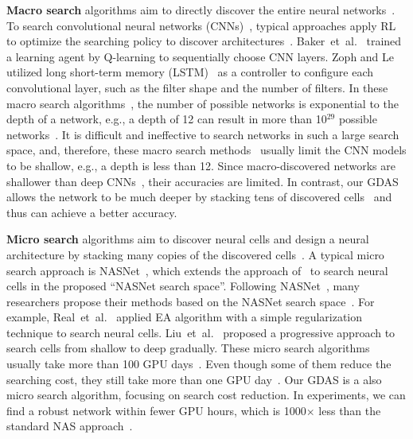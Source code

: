 \documentclass[10pt,twocolumn,letterpaper]{article}
\begin{document}
\textbf{Macro search} algorithms aim to directly discover the entire neural networks~\cite{cai2018efficient,brock2018smash,Véniat_2018_CVPR,zoph2017NAS,li2019partial}.
To search convolutional neural networks (CNNs)~\cite{krizhevsky2012imagenet}, typical approaches apply RL to optimize the searching policy to discover architectures~\cite{baker2017designing,cai2018efficient,zoph2017NAS,pmlr-v80-pham18a}.
Baker~et~al.~\cite{baker2017designing} trained a learning agent by Q-learning to sequentially choose CNN layers.
Zoph and Le~\cite{zoph2017NAS} utilized long short-term memory (LSTM)~\cite{hochreiter1997long} as a controller to configure each convolutional layer, such as the filter shape and the number of filters.
In these macro search algorithms~\cite{baker2017designing,cai2018efficient,zoph2017NAS}, the number of possible networks is exponential to the depth of a network, e.g., a depth of 12 can result in more than 10$^{29}$ possible networks~\cite{pmlr-v80-pham18a}.
It is difficult and ineffective to search networks in such a large search space, and, therefore, these macro search methods~\cite{pmlr-v80-pham18a,zoph2017NAS,cai2018efficient} usually limit the CNN models to be shallow, e.g., a depth is less than 12.
Since macro-discovered networks are shallower than deep CNNs~\cite{he2016deep,huang2017densely}, their accuracies are limited.
In contrast, our GDAS allows the network to be much deeper by stacking tens of discovered cells~\cite{Zoph_2018_CVPR} and thus can achieve a better accuracy.




\textbf{Micro search} algorithms aim to discover neural cells and design a neural architecture by stacking many copies of the discovered cells~\cite{Zoph_2018_CVPR,real2019regularized,real2017large,pmlr-v80-pham18a}.
A typical micro search approach is NASNet~\cite{Zoph_2018_CVPR}, which extends the approach of~\cite{zoph2017NAS} to search neural cells in the proposed ``NASNet search space''.
Following NASNet~\cite{Zoph_2018_CVPR}, many researchers propose their methods based on the NASNet search space~\cite{Liu_2018_ECCV,liu2019darts,cai2018efficient,real2019regularized}.
For example, Real~et~al.~\cite{real2019regularized} applied EA algorithm with a simple regularization technique to search neural cells.
Liu~et~al.~\cite{Liu_2018_ECCV} proposed a progressive approach to search cells from shallow to deep gradually.
These micro search algorithms usually take more than 100 GPU days~\cite{Liu_2018_ECCV,Zoph_2018_CVPR}.
Even though some of them reduce the searching cost, they still take more than one GPU day~\cite{liu2019darts}.
Our GDAS is a also micro search algorithm, focusing on search cost reduction. In experiments, we can find a robust network within fewer GPU hours, which is 1000$\times$ less than the standard NAS approach~\cite{Zoph_2018_CVPR}.
\end{document}
